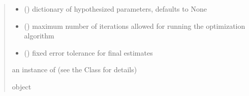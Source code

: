 \documentclass[letterpaper,10pt,english]{sphinxmanual}
\begin{document}
\begin{fulllineitems}
\begin{quote}
\begin{description}
\begin{itemize}
\item {} 
\sphinxAtStartPar
{} (\sphinxstyleliteralemphasis{\sphinxupquote{, }}) \textendash{} dictionary of hypothesized parameters, defaults to None

\item {} 
\sphinxAtStartPar
{} () \textendash{} maximum number of iterations allowed for running the optimization algorithm

\item {} 
\sphinxAtStartPar
{} () \textendash{} fixed error tolerance for final estimates

\end{itemize}

\sphinxAtStartPar
an instance of  (see the Class for details)

\sphinxAtStartPar
object

\end{description}\end{quote}

\end{fulllineitems}

\end{document}
